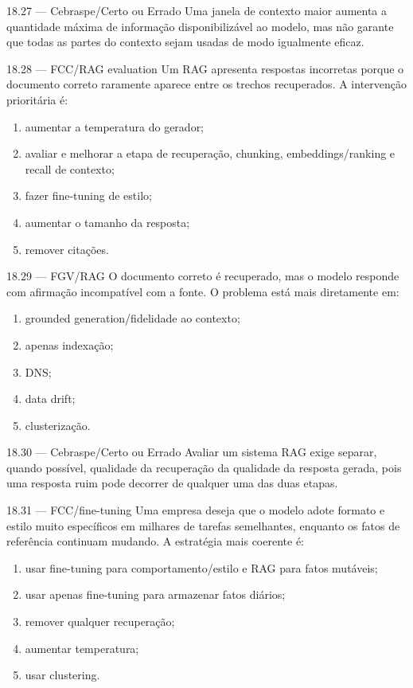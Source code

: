 \begin{questao}{ 18.27 — Cebraspe/Certo ou Errado}
Uma janela de contexto maior aumenta a quantidade máxima de informação disponibilizável ao modelo, mas não garante que todas as partes do contexto sejam usadas de modo igualmente eficaz.
\end{questao}

\begin{questao}{ 18.28 — FCC/RAG evaluation}
Um RAG apresenta respostas incorretas porque o documento correto raramente aparece entre os trechos recuperados. A intervenção prioritária é:
\begin{enumerate}[label=\Alph*)]
\item aumentar a temperatura do gerador;
\item avaliar e melhorar a etapa de recuperação, chunking, embeddings/ranking e recall de contexto;
\item fazer fine-tuning de estilo;
\item aumentar o tamanho da resposta;
\item remover citações.
\end{enumerate}
\end{questao}

\begin{questao}{ 18.29 — FGV/RAG}
O documento correto é recuperado, mas o modelo responde com afirmação incompatível com a fonte. O problema está mais diretamente em:
\begin{enumerate}[label=\Alph*)]
\item grounded generation/fidelidade ao contexto;
\item apenas indexação;
\item DNS;
\item data drift;
\item clusterização.
\end{enumerate}
\end{questao}

\begin{questao}{ 18.30 — Cebraspe/Certo ou Errado}
Avaliar um sistema RAG exige separar, quando possível, qualidade da recuperação da qualidade da resposta gerada, pois uma resposta ruim pode decorrer de qualquer uma das duas etapas.
\end{questao}

\begin{questao}{ 18.31 — FCC/fine-tuning}
Uma empresa deseja que o modelo adote formato e estilo muito específicos em milhares de tarefas semelhantes, enquanto os fatos de referência continuam mudando. A estratégia mais coerente é:
\begin{enumerate}[label=\Alph*)]
\item usar fine-tuning para comportamento/estilo e RAG para fatos mutáveis;
\item usar apenas fine-tuning para armazenar fatos diários;
\item remover qualquer recuperação;
\item aumentar temperatura;
\item usar clustering.
\end{enumerate}
\end{questao}

